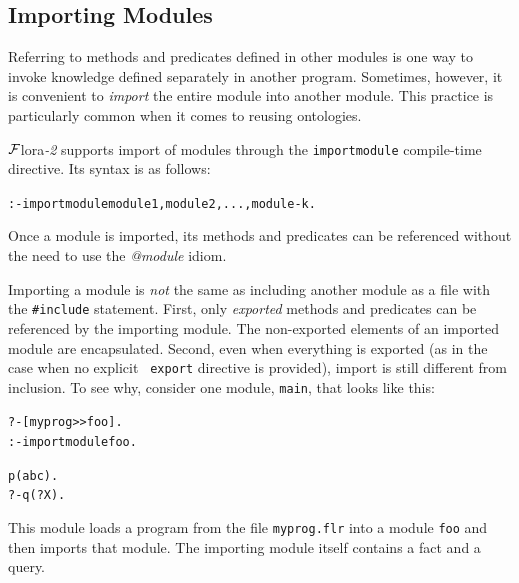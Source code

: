 \documentclass[11pt]{article}
\newcommand{\FLORA}{{\mbox{\sc ${\cal F}${lora}\rm\emph{-2}}}\xspace}
\begin{document}
\subsection{Importing Modules}\label{sec-module-import}

Referring to methods and predicates defined in other modules is one way to
invoke knowledge defined separately in another program. Sometimes, however,
it is convenient to \emph{import} the entire module into another module.
This practice is particularly common when it comes to reusing ontologies.

\FLORA supports import of modules through the {\tt importmodule}
compile-time directive. Its syntax is as follows:

\begin{alltt}
 :- importmodule {\tt module1}, {\tt module2}, ..., {\tt module-k}.   
\end{alltt}

Once a module is imported, its methods and predicates can be referenced
without the need to use the \emph{@module} idiom. 

Importing a module is \emph{not} the same as including another module as a
file with the {\tt \#include} statement. First, only \emph{exported}
methods and predicates can be referenced by the importing module.
The non-exported elements of an imported module are encapsulated.
Second,
even when everything is exported (as in the case when no explicit {\tt
  export} directive is provided), import is still different from inclusion.
To see why, consider one module, {\tt main}, that looks like this:

\begin{alltt}
  ?- [myprog>>foo].
  :- importmodule foo.

  p(abc).
  ?- q(?X).
\end{alltt}
This module loads a program from the file {\tt myprog.flr} into a module
{\tt foo} and then imports that module.  
The importing module itself contains a fact and a query.
\end{document}
